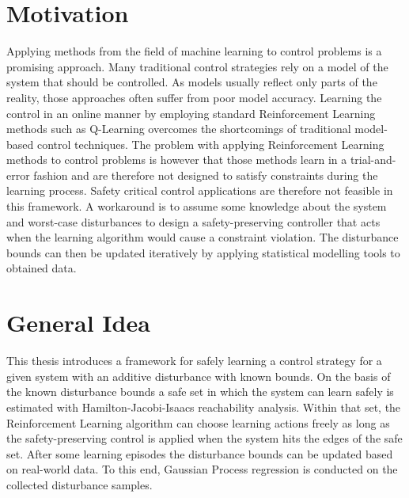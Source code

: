 \documentclass[../main.tex]{subfiles}
\begin{document}
\section{Motivation}
Applying methods from the field of machine learning to control problems is a promising approach. Many traditional control strategies rely on a model of the system that should be controlled. As models usually reflect only parts of the reality, those approaches often suffer from poor model accuracy. Learning the control in an online manner by employing standard Reinforcement Learning methods such as Q-Learning overcomes the shortcomings of traditional model-based control techniques. The problem with applying Reinforcement Learning methods to control problems is however that those methods learn in a trial-and-error fashion and are therefore not designed to satisfy constraints during the learning process. Safety critical control applications are therefore not feasible in this framework. A workaround is to assume some knowledge about the system and worst-case disturbances to design a safety-preserving controller that acts when the learning algorithm would cause a constraint violation. The disturbance bounds can then be updated iteratively by applying statistical modelling tools to obtained data. 

\section{General Idea}
This thesis introduces a framework for safely learning a control strategy for a given system with an additive disturbance with known bounds. On the basis of the known disturbance bounds a safe set in which the system can learn safely is estimated with Hamilton-Jacobi-Isaacs reachability analysis. Within that set, the Reinforcement Learning algorithm can choose learning actions freely as long as the safety-preserving control is applied when the system hits the edges of the safe set. After some learning episodes the disturbance bounds can be updated based on real-world data. To this end, Gaussian Process regression is conducted on the collected disturbance samples. 
\end{document}
